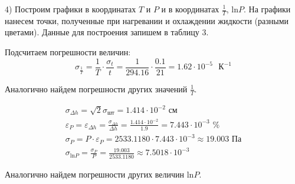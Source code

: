 \documentclass[11pt]{article}
\begin{document}
\par 4) Построим графики в координатах $T$ и $P$ и в координатах $\frac{1}{T}$, ln$P$. На графики нанесем точки, полученные при нагревании и охлаждении жидкости (разными цветами). Данные для построения запишем в таблицу 3.

Подсчитаем погрешности величин:
\begin{equation*}
    \sigma_{\frac{1}{T}} = \frac{1}{T} \cdot \frac{\sigma_{t}}{t} = \frac{1}{294.16} \cdot \frac{0.1}{21} = 1.62 \cdot 10^{-5} \text{ } К^{-1}
\end{equation*}
\par Аналогично найдем погрешности других значений $\frac{1}{T}$.

\begin{equation*}
  \begin{gathered}
    \sigma_{\Delta h} = \sqrt{2}\sigma_{шт} = 1.414\cdot10^{-2} \text{ см} \\
    \varepsilon_{P} = \varepsilon_{\Delta h} = \frac{\sigma_{\Delta h}}{\Delta h} = \frac{1.414\cdot10^{-2}}{1.9} = 7.443\cdot10^{-3} \text{ \%} \\
    \sigma_{P} = P \cdot \varepsilon_{P} = 2533.1180 \cdot 7.443 \cdot 10^{-3} \approx 19.003 \text{ Па} \\
    \sigma_{\text{ln}P} = \frac{\sigma_{P}}{P} = \frac{19.003}{2533.1180} \approx 7.5018 \cdot 10^{-3}
  \end{gathered}
\end{equation*}

\par Аналогично найдем погрешности других величин ln$P$.
\end{document}

